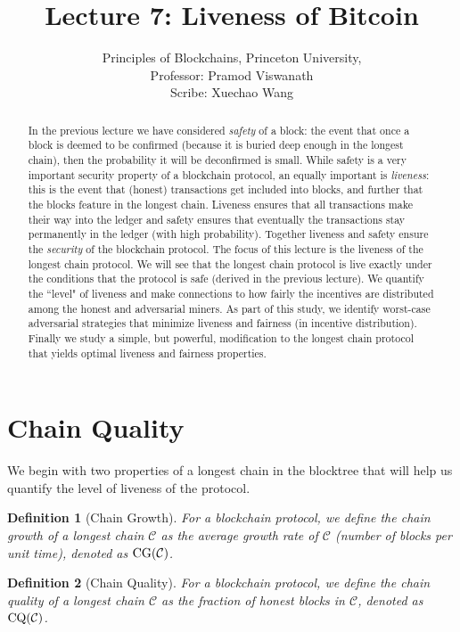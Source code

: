 \documentclass{article}
\title{Lecture 7:   Liveness of Bitcoin}
\author{Principles of Blockchains, Princeton University,  \\ Professor:  Pramod Viswanath \\ Scribe:  Xuechao Wang}
\newtheorem{definition}{Definition}
\begin{document}
\maketitle

\begin{abstract}
In the previous lecture we have considered {\em safety} of a block: the event that once a block is deemed to be confirmed (because it is buried deep enough in the longest chain), then the probability it will be deconfirmed is small. While safety is a very important security property of a blockchain protocol, an equally important is {\em liveness}: this is the event that (honest) transactions get included into blocks, and further that the blocks feature in the longest chain. Liveness ensures that all transactions make their way into the ledger and safety ensures that eventually the transactions stay permanently in the ledger (with high probability). Together liveness and safety ensure the {\em security} of the blockchain protocol. The focus of this lecture is the liveness of the longest chain protocol. We will see that the longest chain protocol is live exactly under the conditions that the protocol is safe (derived in the previous lecture). We quantify the ``level" of liveness and make connections to how fairly the incentives are distributed among the honest and adversarial miners. As part of this study, we  identify  worst-case adversarial strategies that minimize liveness  and fairness (in incentive distribution). Finally we study a simple, but powerful, modification to the longest chain protocol that yields optimal liveness and fairness properties. 
\end{abstract}

\section*{Chain Quality}

We begin with two properties of a longest chain in the blocktree that will help us quantify the level of liveness of the protocol.  

\begin{definition}[Chain Growth]
For a blockchain protocol, we define the chain growth of a longest chain $\mathcal{C}$ as the average growth rate of  $\mathcal{C}$ (number of blocks per unit time), denoted as ${\rm CG}(\mathcal{C})$.
\end{definition}


\begin{definition}[Chain Quality]
For a blockchain protocol, we define the chain quality of a longest chain $\mathcal{C}$ as the fraction of honest blocks in $\mathcal{C}$, denoted as ${\rm CQ}(\mathcal{C})$.
\end{definition}
\end{document}

